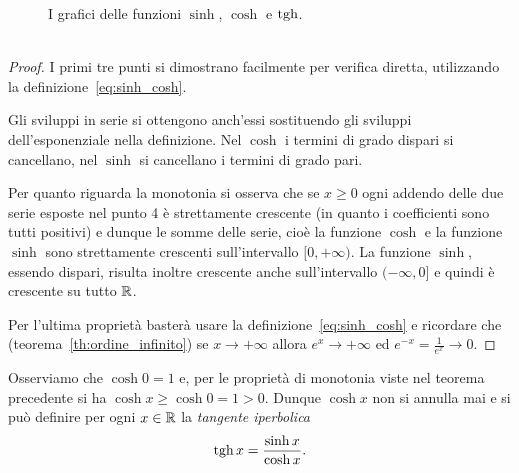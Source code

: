 \newsavebox{\qrfigiperb}%
\begin{figure}
  \centering%
  \caption{%
    I grafici delle funzioni $\sinh$, $\cosh$ e $\tgh$.
    \ifwidemargin\\\\\fi%
    \usebox{\qrfigiperb}%
  }
\end{figure}

\begin{proof}
I primi tre punti si dimostrano facilmente per verifica diretta,
utilizzando la definizione~\eqref{eq:sinh_cosh}.

Gli sviluppi in serie si ottengono anch'essi sostituendo
gli sviluppi dell'esponenziale nella definizione.
Nel $\cosh$ i termini di grado dispari si cancellano, nel $\sinh$ si cancellano
i termini di grado pari.

Per quanto riguarda la monotonia si osserva che se $x\ge 0$ ogni
addendo delle due serie esposte nel punto 4 è strettamente crescente
(in quanto i coefficienti sono tutti positivi) e dunque le somme delle serie,
cioè la funzione $\cosh$ e la funzione $\sinh$ sono strettamente crescenti
sull'intervallo $[0,+\infty)$. La funzione $\sinh$, essendo dispari,
risulta inoltre crescente anche sull'intervallo $(-\infty,0]$ e quindi
è crescente su tutto ${\mathbb R}$.

Per l'ultima proprietà basterà usare la definizione~\eqref{eq:sinh_cosh}
e ricordare che (teorema~\ref{th:ordine_infinito})
se $x\to +\infty$ allora
$e^x\to +\infty$ ed $e^{-x}=\frac{1}{e^{x}} \to 0$.
\end{proof}

Osserviamo che $\cosh 0 = 1$ e, per le proprietà di monotonia viste nel teorema
precedente si ha $\cosh x \ge \cosh 0 = 1 > 0$. Dunque $\cosh x$ non si annulla
mai e si può definire per ogni $x\in {\mathbb R}$ la \emph{tangente iperbolica}
%
\mymargin{$\tgh$}%
\[
    \operatorname{tgh} x = \frac{\sinh x}{\cosh x}.
\]

